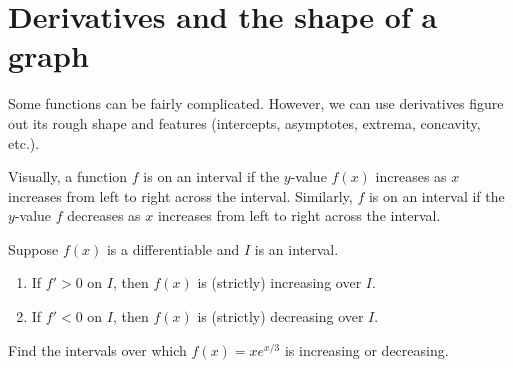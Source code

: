 \documentclass[../main.tex]{subfiles}
\begin{document}
 \section{Derivatives and the shape of a graph}

Some functions can be fairly complicated. However, we can use derivatives figure out its rough shape and features (intercepts, asymptotes, extrema, concavity, etc.).

Visually, a function \(f\) is  on an interval if the \(y\)-value \(f(x)\) increases as \(x\) increases from left to right across the interval. Similarly, \(f\) is  on an interval if the \(y\)-value \(f\) decreases as \(x\) increases from left to right across the interval.

%   
%   
%   
%   

\begin{center}
  
  \hfill
  
  \hfill
  

\end{center}

\begin{thm} \label{thm:increasing-decreasing}
  Suppose \(f(x)\) is a differentiable and \(I\) is an interval.

  \begin{enumerate}[label=(\alph*)]
    \item If \(f' > 0\) on \(I\), then \(f(x)\) is (strictly) increasing over \(I\).
    \item If \(f' < 0\) on \(I\), then \(f(x)\) is (strictly) decreasing over \(I\).
  \end{enumerate}

\end{thm}


\begin{example} \label{eg:shape-1}
  Find the intervals over which \(f(x) = x e^{x/3}\) is increasing or decreasing.

  \blanks*
\end{example}
\end{document}

